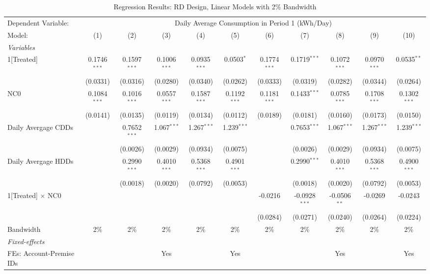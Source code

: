 \begin{table}[htbp]
\centering
\caption{\label{Table:Regression-Results_RD_Linear_BW-2} Regression Results: RD Design, Linear Models with 2\% Bandwidth}
\begin{tabular}{lcccccccccc}
\tabularnewline\toprule\toprule
Dependent Variable:&\multicolumn{10}{c}{Daily Average Consumption in Period 1 (kWh/Day)}\\
Model:&(1) & (2) & (3) & (4) & (5) & (6) & (7) & (8) & (9) & (10)\\
\midrule
\emph{Variables}&   &   &   &   &   &   &   &   &   &  \\
1[Treated]&0.1746$^{***}$ & 0.1597$^{***}$ & 0.1006$^{***}$ & 0.0935$^{***}$ & 0.0503$^{*}$ & 0.1774$^{***}$ & 0.1719$^{***}$ & 0.1072$^{***}$ & 0.0970$^{***}$ & 0.0535$^{**}$\\
  &(0.0331) & (0.0316) & (0.0280) & (0.0340) & (0.0262) & (0.0333) & (0.0319) & (0.0282) & (0.0344) & (0.0264)\\
NC0&0.1084$^{***}$ & 0.1016$^{***}$ & 0.0557$^{***}$ & 0.1587$^{***}$ & 0.1192$^{***}$ & 0.1181$^{***}$ & 0.1433$^{***}$ & 0.0785$^{***}$ & 0.1708$^{***}$ & 0.1302$^{***}$\\
  &(0.0141) & (0.0135) & (0.0119) & (0.0134) & (0.0112) & (0.0189) & (0.0181) & (0.0160) & (0.0173) & (0.0150)\\
Daily Avergage CDDs&   & 0.7652$^{***}$ & 1.067$^{***}$ & 1.267$^{***}$ & 1.239$^{***}$ &    & 0.7653$^{***}$ & 1.067$^{***}$ & 1.267$^{***}$ & 1.239$^{***}$\\
  &   & (0.0026) & (0.0029) & (0.0934) & (0.0075) &    & (0.0026) & (0.0029) & (0.0934) & (0.0075)\\
Daily Avergage HDDs&   & 0.2990$^{***}$ & 0.4010$^{***}$ & 0.5368$^{***}$ & 0.4901$^{***}$ &    & 0.2990$^{***}$ & 0.4010$^{***}$ & 0.5368$^{***}$ & 0.4900$^{***}$\\
  &   & (0.0018) & (0.0020) & (0.0792) & (0.0053) &    & (0.0018) & (0.0020) & (0.0792) & (0.0053)\\
1[Treated] $\times $ NC0&   &    &    &    &    & -0.0216 & -0.0928$^{***}$ & -0.0506$^{**}$ & -0.0269 & -0.0243\\
  &   &    &    &    &    & (0.0284) & (0.0271) & (0.0240) & (0.0264) & (0.0224)\\
\midrule Bandwidth & 2\% & 2\% & 2\% & 2\% & 2\% & 2\% & 2\% & 2\% & 2\% & 2\%\\
\midrule
\emph{Fixed-effects}&   &   &   &   &   &   &   &   &   &  \\
FEs: Account-Premise IDs &  &  & Yes &  & Yes &  &  & Yes &  & Yes\\

\end{tabular}
\end{table}

